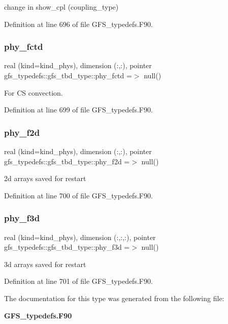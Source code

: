 change in show\+\_\+cpl (coupling\+\_\+type) 



Definition at line 696 of file G\+F\+S\+\_\+typedefs.\+F90.

\mbox{\label{structgfs__typedefs_1_1gfs__tbd__type_aa898d58c01ded5fa992af4235f618ad7}} 
\subsubsection{phy\+\_\+fctd}
{\footnotesize\ttfamily real (kind=kind\+\_\+phys), dimension (\+:,\+:), pointer gfs\+\_\+typedefs\+::gfs\+\_\+tbd\+\_\+type\+::phy\+\_\+fctd =$>$ null()}



For CS convection. 



Definition at line 699 of file G\+F\+S\+\_\+typedefs.\+F90.

\mbox{\label{structgfs__typedefs_1_1gfs__tbd__type_a8f4cb930ebc7799026cd6ccc1e9002ca}} 
\subsubsection{phy\+\_\+f2d}
{\footnotesize\ttfamily real (kind=kind\+\_\+phys), dimension  (\+:,\+:), pointer gfs\+\_\+typedefs\+::gfs\+\_\+tbd\+\_\+type\+::phy\+\_\+f2d =$>$ null()}



2d arrays saved for restart 



Definition at line 700 of file G\+F\+S\+\_\+typedefs.\+F90.

\mbox{\label{structgfs__typedefs_1_1gfs__tbd__type_a0517446633a07123a504641f34640cd1}} 
\subsubsection{phy\+\_\+f3d}
{\footnotesize\ttfamily real (kind=kind\+\_\+phys), dimension  (\+:,\+:,\+:), pointer gfs\+\_\+typedefs\+::gfs\+\_\+tbd\+\_\+type\+::phy\+\_\+f3d =$>$ null()}



3d arrays saved for restart 



Definition at line 701 of file G\+F\+S\+\_\+typedefs.\+F90.



The documentation for this type was generated from the following file\+:\begin{DoxyCompactItemize}
\item 
\textbf{ G\+F\+S\+\_\+typedefs.\+F90}\end{DoxyCompactItemize}
